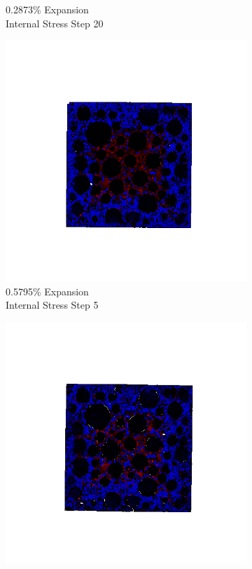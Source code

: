 \begin{figure}[ht!]
\begin{subfigure}{.25\textwidth}
      \caption{0.2873\% Expansion\\Internal Stress Step 20}
    \end{subfigure}
    \begin{subfigure}{.25\textwidth}
      \centering
      \includegraphics[width=1.0\linewidth]{Files/exp_3D/DEF/A30X0C_3_s5.png}
      \caption{0.5795\% Expansion\\Internal Stress Step 5}
    \end{subfigure}%
    \begin{subfigure}{.25\textwidth}
      \centering
      \includegraphics[width=1.0\linewidth]{Files/exp_3D/DEF/A30X0C_3_s10.png}

\end{subfigure}
\end{figure}
